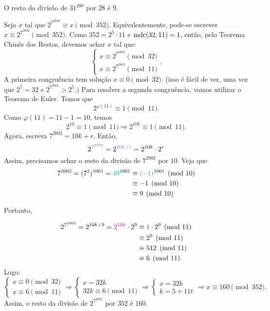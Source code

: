 \documentclass[12pt, a4paper]{article}
\newcommand{\mdc}{{\rm mdc}}
\newcommand{\negrito}[1]{\mbox{\boldmath{$#1$}}}
\newcommand{\alt}[1]{\textcolor{Floresta}{$\negrito{(#1)} $}}
\begin{document}
\begin{solution}
{ O resto da divisão de $31^{200}$ por $28$ é $9$.
 
\task[\alt{e}] Seja $x$ tal que $2^{7^{2002}} \equiv x \pmod{352}.$ Equivalentemente, pode-se escrever $x \equiv 2^{7^{2002}} \pmod{352}.$ Como $352=2^5\cdot11$ e $\mdc(32,11)=1$, então, pelo Teorema Chinês dos Restos, devemos achar $x$ tal que:
    $$\left\{\begin{array}{l}
    x\equiv 2^{7^{2002}} \pmod{32}\\
    x\equiv 2^{7^{2002}} \pmod{11}
    \end{array}\right.
    .$$
    A primeira congruência tem solução $x\equiv 0 \pmod 32$. (isso é fácil de ver, uma vez que $2^5 = 32$ e $2^{7^{2002}} > 2^5.$) Para resolver a segunda congruência, vamos utilizar o Teorema de Euler. Temos que
    \[
    2^{\varphi(11)} \equiv 1 \pmod{11}.
    \]
    Como $\varphi(11)=11-1=10$, temos
    \[
    2^{10} \equiv 1 \pmod{11} \Rightarrow 2^{10k} \equiv 1 \pmod{11}.
    \]    
    Agora, escreva $7^{2002} = 10k + r.$ Então,
    \[
    2^{\textcolor{Periwinkle}{7^{2002}}} = 2^{\textcolor{Periwinkle}{10k+r}} = 2^{10k} \cdot 2^r
    \]
    Assim, precisamos achar o resto da divisão de $7^{2002}$ por $10$. Veja que
    \begin{align*}
        7^{2002} = (7^2)^{1001} = \textcolor{Emerald}{49}^{1001} &\equiv \textcolor{Emerald}{(-1)}^{1001} \pmod{10} \\ 
        &\equiv -1 \pmod{10} \\
        &\equiv 9 \pmod{10}
    \end{align*}

    Portanto, 

\begin{align*}
    2^{7^{2002}} = 2^{10k + 9} = \textcolor{Magenta}{2^{10k}} \cdot 2^9 &\equiv \textcolor{Magenta}{1} \cdot 2^9 \pmod{11} \\
    &\equiv 2^9 \pmod{11} \\
    &\equiv 512 \pmod{11} \\
    &\equiv 6 \pmod{11}.
\end{align*}
    Logo:
    $$\left\{\begin{array}{l}
    x\equiv 0 \pmod{32}\\
    x\equiv 6 \pmod{11}
    \end{array}\right. \Rightarrow 
    \left\{\begin{array}{l}
    x=32k\\
    32k\equiv 6 \pmod{11}
    \end{array}\right. \Rightarrow 
    \left\{\begin{array}{l}
    x=32k\\
    k = 5+11t
    \end{array}\right. \Rightarrow x\equiv 160\pmod{352}
    .$$
 Assim, o resto da divisão de $2^{7^{2002}}$ por $352$ é $160$.
}
\end{solution}
\end{document}
